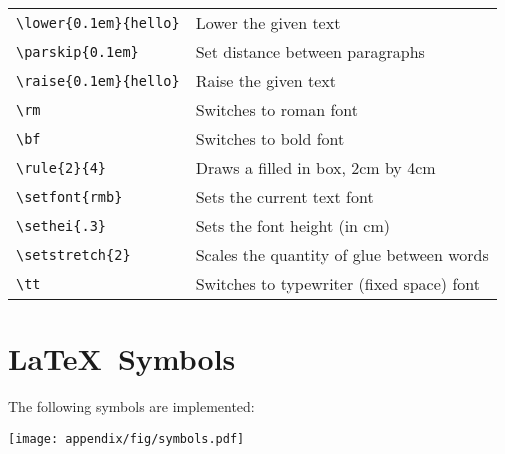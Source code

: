 \begin{tabular}{ll}
\verb+\lower{0.1em}{hello}+ & Lower the given text \\
\verb+\parskip{0.1em}+      & Set distance between paragraphs \\
\verb+\raise{0.1em}{hello}+ & Raise the given text \\
\verb+\rm+                  & Switches to roman font \\
\verb+\bf+                  & Switches to bold font \\
\verb+\rule{2}{4}+          & Draws a filled in box, 2cm by 4cm \\
\verb+\setfont{rmb}+        & Sets the current text font \\
\verb+\sethei{.3}+          & Sets the font height (in cm) \\
\verb+\setstretch{2}+       & Scales the quantity of glue between words \\
\verb+\tt+                  & Switches to typewriter (fixed space) font \\
\end{tabular}

\newpage
\section{\LaTeX\ Symbols}

The following symbols are implemented:

\texttt{[image: appendix/fig/symbols.pdf]}


